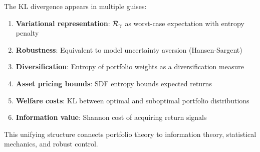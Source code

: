 \begin{calloutimportant}
The KL divergence appears in multiple guises:
\begin{enumerate}[nosep]
    \item \textbf{Variational representation}: $\mathcal{R}_{\gamma}$ as worst-case expectation with entropy penalty
    \item \textbf{Robustness}: Equivalent to model uncertainty aversion (Hansen-Sargent)
    \item \textbf{Diversification}: Entropy of portfolio weights as a diversification measure
    \item \textbf{Asset pricing bounds}: SDF entropy bounds expected returns
    \item \textbf{Welfare costs}: KL between optimal and suboptimal portfolio distributions
    \item \textbf{Information value}: Shannon cost of acquiring return signals
\end{enumerate}
This unifying structure connects portfolio theory to information theory, statistical mechanics, and robust control.
\end{calloutimportant}

